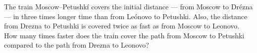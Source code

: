 \problem
The train Moscow--Petushk{\'i} covers the initial distance --- from Moscow to Dr\'ezna --- in three times longer time than from Le\'onovo to Petushki. 
Also, the distance from Drezna to Petushki is covered twice as fast as from Moscow to Leonovo. 
How many times faster does the train cover the path from Moscow to Petushki compared to the path from Drezna to Leonovo?
\solution
\endproblem
